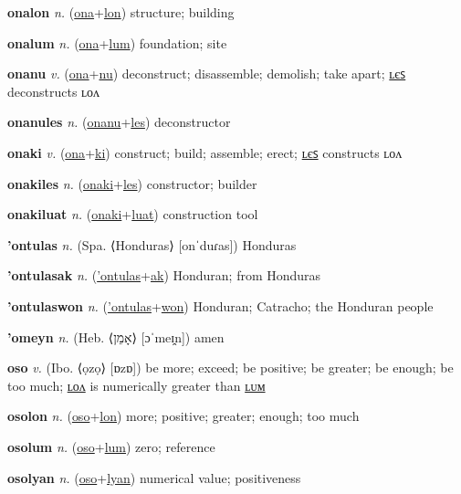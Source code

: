 \textbf{\hypertarget{onalon}{onalon}} \textit{n.} (\hyperlink{ona}{ona}+\allowbreak \hyperlink{lon}{lon})
structure; building

\textbf{\hypertarget{onalum}{onalum}} \textit{n.} (\hyperlink{ona}{ona}+\allowbreak \hyperlink{lum}{lum})
foundation; site

\textbf{\hypertarget{onanu}{onanu}} \textit{v.} (\hyperlink{ona}{ona}+\allowbreak \hyperlink{nu}{nu})
deconstruct; disassemble; demolish; take apart; \hyperlink{onanules}{ʟєꜱ} deconstructs ʟᴏᴧ

\textbf{\hypertarget{onanules}{onanules}} \textit{n.} (\hyperlink{onanu}{onanu}+\allowbreak \hyperlink{les}{les})
deconstructor

\textbf{\hypertarget{onaki}{onaki}} \textit{v.} (\hyperlink{ona}{ona}+\allowbreak \hyperlink{ki}{ki})
construct; build; assemble; erect; \hyperlink{onakiles}{ʟєꜱ} constructs ʟᴏᴧ

\textbf{\hypertarget{onakiles}{onakiles}} \textit{n.} (\hyperlink{onaki}{onaki}+\allowbreak \hyperlink{les}{les})
constructor; builder

\textbf{\hypertarget{onakiluat}{onakiluat}} \textit{n.} (\hyperlink{onaki}{onaki}+\allowbreak \hyperlink{luat}{luat})
construction tool

\textbf{\hypertarget{'ontulas}{'ontulas}} \textit{n.} (Spa. ⟨Honduras⟩ [onˈduɾas])
Honduras

\textbf{\hypertarget{'ontulasak}{'ontulasak}} \textit{n.} (\hyperlink{'ontulas}{'ontulas}+\allowbreak \hyperlink{ak}{ak})
Honduran; from Honduras

\textbf{\hypertarget{'ontulaswon}{'ontulaswon}} \textit{n.} (\hyperlink{'ontulas}{'ontulas}+\allowbreak \hyperlink{won}{won})
Honduran; Catracho; the Honduran people

\textbf{\hypertarget{'omeyn}{'omeyn}} \textit{n.} (Heb. ⟨{\hebrew{}אָמֵן}⟩ [ɔˈmeɪ̯n])
amen

\textbf{\hypertarget{oso}{oso}} \textit{v.} (Ibo. ⟨ọzọ⟩ [ɒzɒ])
be more; exceed; be positive; be greater; be enough; be too much; \hyperlink{osolon}{ʟᴏᴧ} is numerically greater than \hyperlink{osolum}{ʟᴜᴍ}

\textbf{\hypertarget{osolon}{osolon}} \textit{n.} (\hyperlink{oso}{oso}+\allowbreak \hyperlink{lon}{lon})
more; positive; greater; enough; too much

\textbf{\hypertarget{osolum}{osolum}} \textit{n.} (\hyperlink{oso}{oso}+\allowbreak \hyperlink{lum}{lum})
zero; reference

\textbf{\hypertarget{osolyan}{osolyan}} \textit{n.} (\hyperlink{oso}{oso}+\allowbreak \hyperlink{lyan}{lyan})
numerical value; positiveness

